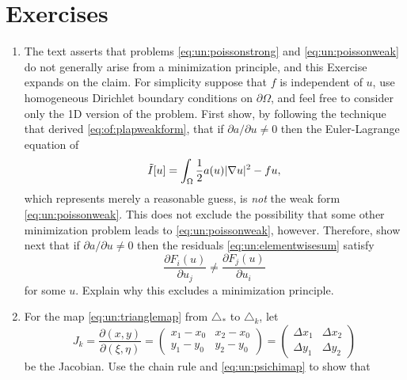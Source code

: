 \section{Exercises}

\renewcommand{\labelenumi}{\arabic{chapter}.\arabic{enumi}\quad}
\renewcommand{\labelenumii}{(\alph{enumii})}
\begin{enumerate}
\item \label{exer:un:notminimization}  The text asserts that problems \eqref{eq:un:poissonstrong} and \eqref{eq:un:poissonweak} do not generally arise from a minimization principle, and this Exercise expands on the claim.  For simplicity suppose that $f$ is independent of $u$, use homogeneous Dirichlet boundary conditions on $\partial \Omega$, and feel free to consider only the 1D version of the problem.  First show, by following the technique that derived \eqref{eq:of:plapweakform}, that if $\partial a/\partial u \ne 0$ then the Euler-Lagrange equation of
\begin{equation}
  \tilde I[u] = \int_\Omega \frac{1}{2} a(u) |\nabla u|^2 - f u,  \label{eq:un:nottheobjective}
\end{equation}
which represents merely a reasonable guess, is \emph{not} the weak form \eqref{eq:un:poissonweak}.  This does not exclude the possibility that some other minimization problem leads to \eqref{eq:un:poissonweak}, however.  Therefore, show next that if $\partial a/\partial u \ne 0$ then the residuals \eqref{eq:un:elementwisesum} satisfy
\begin{equation}
  \frac{\partial F_i(u)}{\partial u_j} \ne \frac{\partial F_j(u)}{\partial u_i} \label{eq:un:symmetryresidualsdonthave}
\end{equation}
for some $u$.  Explain why this excludes a minimization principle.
\item  \label{exer:un:gradientdetails}  For the map \eqref{eq:un:trianglemap} from $\triangle_\ast$ to $\triangle_k$, let
    $$J_k = \frac{\partial (x,y)}{\partial (\xi,\eta)} = \begin{pmatrix}
    x_1 - x_0 & x_2 - x_0 \\
    y_1 - y_0 & y_2 - y_0 \end{pmatrix}
    = \begin{pmatrix}
    \Delta x_1 & \Delta x_2 \\
    \Delta y_1 & \Delta y_2
    \end{pmatrix}$$
be the Jacobian.  Use the chain rule and \eqref{eq:un:psichimap} to show that
\begin{equation}

\end{equation}
\end{enumerate}
